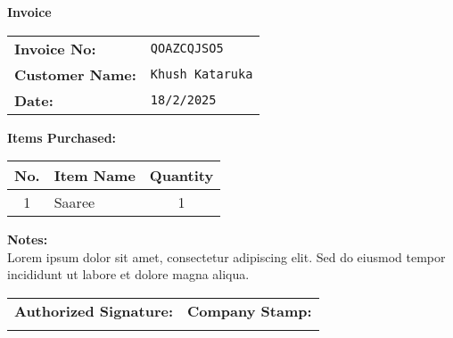 \documentclass{article}
\begin{document}
        \begin{center}
            {\Huge \textbf{Invoice}} \\[1em]
        \end{center}

        \noindent
        \begin{tabular}{@{}ll@{}}
            \textbf{Invoice No:} & \texttt{QOAZCQJSO5} \\
            \textbf{Customer Name:} & \texttt{Khush Kataruka} \\
            \textbf{Date:} & \texttt{18/2/2025} \\
        \end{tabular}

        \vspace{2em}

        \textbf{Items Purchased:} \\

        \begin{tabular}{|c|l|c|}
            \hline
            \textbf{No.} & \textbf{Item Name} & \textbf{Quantity} \\
            \hline
            1 & Saaree & 1 \\ \hline
        \end{tabular}

        \vspace{2em}

        \noindent
        \textbf{Notes:} \\
        Lorem ipsum dolor sit amet, consectetur adipiscing elit. Sed do eiusmod tempor incididunt ut labore et dolore magna aliqua.
        \vspace{1em}

        \noindent
        \begin{tabular}{@{}p{}p{}@{}}
            \textbf{Authorized Signature:} & \textbf{Company Stamp:} \\
            \vspace{2cm} & \vspace{2cm} \\
        \end{tabular}

        
\end{document}

